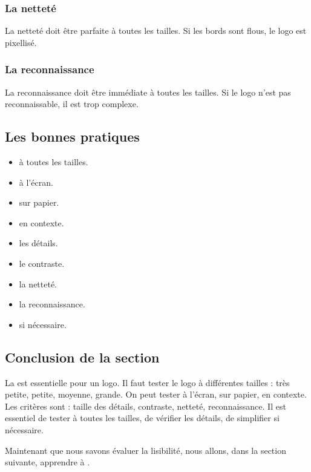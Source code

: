 \subsubsection{La netteté}

La netteté doit être parfaite à toutes les tailles. Si les bords sont flous, le logo est pixellisé.

\subsubsection{La reconnaissance}

La reconnaissance doit être immédiate à toutes les tailles. Si le logo n'est pas reconnaissable, il est trop complexe.

\subsection{Les bonnes pratiques}

\begin{itemize}
    \item {} à toutes les tailles.
    \item {} à l'écran.
    \item {} sur papier.
    \item {} en contexte.
    \item {} les détails.
    \item {} le contraste.
    \item {} la netteté.
    \item {} la reconnaissance.
    \item {} si nécessaire.
\end{itemize}

\subsection*{Conclusion de la section}

La  est essentielle pour un logo. Il faut tester le logo à différentes tailles : très petite, petite, moyenne, grande. On peut tester à l'écran, sur papier, en contexte. Les critères sont : taille des détails, contraste, netteté, reconnaissance. Il est essentiel de tester à toutes les tailles, de vérifier les détails, de simplifier si nécessaire.

Maintenant que nous savons évaluer la lisibilité, nous allons, dans la section suivante, apprendre à .

